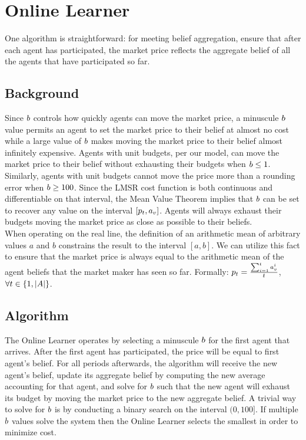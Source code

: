 \section{Online Learner}
One algorithm is straightforward: for meeting belief aggregation, ensure that after each agent has participated, the market price reflects the aggregate belief of all the agents that have participated so far.

\subsection{Background}
Since $b$ controls how quickly agents can move the market price, a minuscule $b$ value permits an agent to set the market price to their belief at almost no cost while a large value of $b$ makes moving the market price to their belief almost infinitely expensive. Agents with unit budgets, per our model, can move the market price to their belief without exhausting their budgets when $b \leq 1$. Similarly, agents with unit budgets cannot move the price more than a rounding error when $b \ge 100$. Since the LMSR cost function is both continuous and differentiable on that interval, the Mean Value Theorem implies that $b$ can be set to recover any value on the interval $[p_t, a_v]$. Agents will always exhaust their budgets moving the market price as close as possible to their beliefs.\\

When operating on the real line, the definition of an arithmetic mean of arbitrary values $a$ and $b$ constrains the result to the interval $[a,b]$. We can utilize this fact to ensure that the market price is always equal to the arithmetic mean of the agent beliefs that the market maker has seen so far. Formally: $p_t = \frac{\sum_{i=1}^{t} a^{i}_v}{t}$, $\forall t \in \{1,|A|\}$.\\

\subsection{Algorithm}
The Online Learner operates by selecting a minuscule $b$ for the first agent that arrives. After the first agent has participated, the price will be equal to first agent's belief. For all periods afterwards, the algorithm will receive the new agent's belief, update its aggregate belief by computing the new average accounting for that agent, and solve for $b$ such that the new agent will exhaust its budget by moving the market price to the new aggregate belief. A trivial way to solve for $b$ is by conducting a binary search on the interval $(0, 100]$. If multiple $b$ values solve the system then the Online Learner selects the smallest in order to minimize cost.\\

